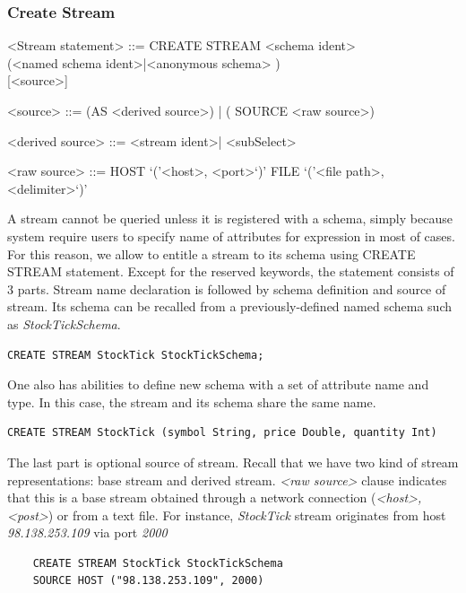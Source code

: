 \subsubsection{Create Stream}
	
					
\begin{grammar}
<Stream statement> ::= CREATE STREAM <schema ident> \\		(<named schema ident>|<anonymous schema> ) \\
{ }[<source>]

<source> ::= (AS <derived source>) | ( SOURCE <raw source>)

<derived source> ::=  <stream ident>| <subSelect>

<raw source> ::= 
				HOST `('<host>, <port>`)'
					\alt FILE `('<file path>, <delimiter>`)'
\end{grammar}

A stream cannot be queried unless it is registered with a schema, simply because system require users to specify name of attributes for expression in most of cases. For this reason, we allow to entitle a stream to its schema using CREATE STREAM statement. Except for the reserved keywords, the statement consists of 3 parts. Stream name declaration is followed by schema definition and source of stream. Its schema can be recalled from a previously-defined named schema such as \textit{StockTickSchema}. 
\begin{verbatim}
CREATE STREAM StockTick StockTickSchema;
\end{verbatim}

One also has abilities to define new schema with a set of attribute name and type. In this case, the stream and its schema share the same name.
\begin{verbatim}
CREATE STREAM StockTick (symbol String, price Double, quantity Int)
\end{verbatim}

The last part is optional source of stream. Recall that we have two kind of stream representations: base stream and derived stream. \textit{<raw source>} clause indicates that this is a base stream obtained through a network connection (\textit{<host>, <post>}) or from a text file. For instance, \textit{StockTick} stream originates from host \textit{98.138.253.109} via port \textit{2000}

\begin{verbatim}
	CREATE STREAM StockTick StockTickSchema 
	SOURCE HOST ("98.138.253.109", 2000)
\end{verbatim}

